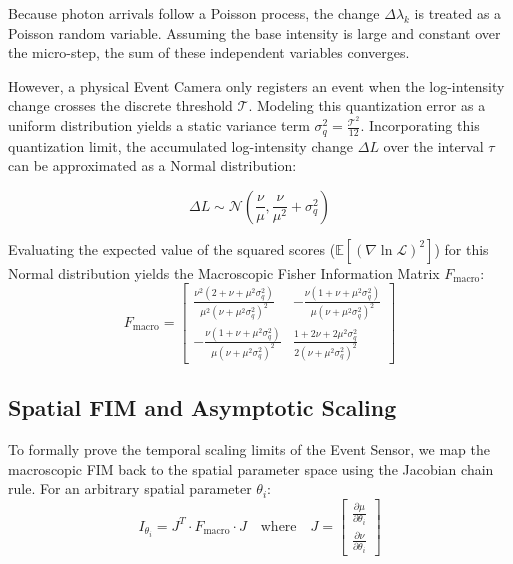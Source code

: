 \documentclass[11pt]{article}
\begin{document}
Because photon arrivals follow a Poisson process, the change $\Delta \lambda_k$ is treated as a Poisson random variable. Assuming the base intensity is large and constant over the micro-step, the sum of these independent variables converges. 

However, a physical Event Camera only registers an event when the log-intensity change crosses the discrete threshold $\mathcal{T}$. Modeling this quantization error as a uniform distribution yields a static variance term $\sigma_q^2 = \frac{\mathcal{T}^2}{12}$. Incorporating this quantization limit, the accumulated log-intensity change $\Delta L$ over the interval $\tau$ can be approximated as a Normal distribution:

\begin{equation}
\Delta L \sim \mathcal{N}\left( \frac{\nu}{\mu}, \frac{\nu}{\mu^2} + \sigma_q^2 \right)
\end{equation}

Evaluating the expected value of the squared scores ($\mathbb{E}[(\nabla \ln \mathcal{L})^2]$) for this Normal distribution yields the Macroscopic Fisher Information Matrix $F_{\text{macro}}$:
\begin{equation}
F_{\text{macro}} = 
\begin{bmatrix}
\frac{\nu^2(2+\nu+\mu^2\sigma_q^2)}{\mu^2(\nu+\mu^2\sigma_q^2)^2} & -\frac{\nu(1+\nu+\mu^2\sigma_q^2)}{\mu(\nu+\mu^2\sigma_q^2)^2} \\[1em]
-\frac{\nu(1+\nu+\mu^2\sigma_q^2)}{\mu(\nu+\mu^2\sigma_q^2)^2} & \frac{1+2\nu+2\mu^2\sigma_q^2}{2(\nu+\mu^2\sigma_q^2)^2}
\end{bmatrix}
\end{equation}

\subsection{Spatial FIM and Asymptotic Scaling}
To formally prove the temporal scaling limits of the Event Sensor, we map the macroscopic FIM back to the spatial parameter space using the Jacobian chain rule. For an arbitrary spatial parameter $\theta_i$:
\begin{equation}
I_{\theta_i} = J^T \cdot F_{\text{macro}} \cdot J \quad \text{where} \quad J = \begin{bmatrix} \frac{\partial \mu}{\partial \theta_i} \\[0.5em] \frac{\partial \nu}{\partial \theta_i} \end{bmatrix}
\end{equation}
\end{document}
